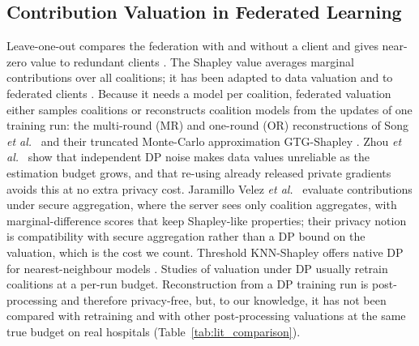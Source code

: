 \documentclass[journal]{IEEEtran}
\begin{document}
\subsection{Contribution Valuation in Federated Learning}
Leave-one-out compares the federation with and without a client and gives near-zero value to redundant clients \cite{Ghorbani2019DataShapley}. The Shapley value \cite{Shapley1953} averages marginal contributions over all coalitions; it has been adapted to data valuation \cite{Ghorbani2019DataShapley, Jia2019KNNShapley, Ghorbani2020NeuronShapley} and to federated clients \cite{Song2019BlockchainFL, Wei2020DataValuation, Lyu2020FairnessFL}. Because it needs a model per coalition, federated valuation either samples coalitions \cite{Maleki2013Bounding, Jia2020EfficientShapley} or reconstructs coalition models from the updates of one training run: the multi-round (MR) and one-round (OR) reconstructions of Song \emph{et al.}\ \cite{Song2019BlockchainFL} and their truncated Monte-Carlo approximation GTG-Shapley \cite{Liu2022GTG}. Zhou \emph{et al.}\ \cite{Zhou2025Data} show that independent DP noise makes data values unreliable as the estimation budget grows, and that re-using already released private gradients avoids this at no extra privacy cost. Jaramillo Velez \emph{et al.}\ \cite{JaramilloVelez2026Beyond} evaluate contributions under secure aggregation, where the server sees only coalition aggregates, with marginal-difference scores that keep Shapley-like properties; their privacy notion is compatibility with secure aggregation rather than a DP bound on the valuation, which is the cost we count. Threshold KNN-Shapley offers native DP for nearest-neighbour models \cite{wang2023threshold}. Studies of valuation under DP usually retrain coalitions at a per-run budget. Reconstruction from a DP training run is post-processing and therefore privacy-free, but, to our knowledge, it has not been compared with retraining and with other post-processing valuations at the same true budget on real hospitals (Table~\ref{tab:lit_comparison}).
\end{document}
